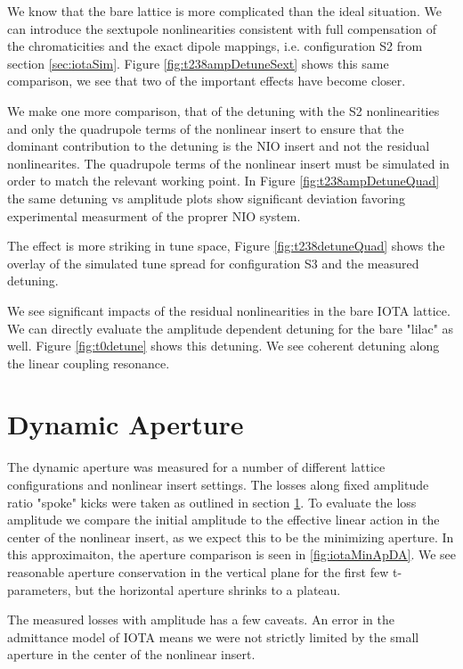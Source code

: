 We know that the bare lattice is more complicated than the ideal situation. We can introduce the sextupole nonlinearities consistent with full compensation of the chromaticities and the exact dipole mappings, i.e. configuration S2 from section \ref{sec:iotaSim}. Figure \ref{fig:t238ampDetuneSext} shows this same comparison, we see that two of the important effects have become closer.

We make one more comparison, that of the detuning with the S2 nonlinearities and only the quadrupole terms of the nonlinear insert to ensure that the dominant contribution to the detuning is the NIO insert and not the residual nonlinearites. The quadrupole terms of the nonlinear insert must be simulated in order to match the relevant working point. In Figure \ref{fig:t238ampDetuneQuad} the same detuning vs amplitude plots show significant deviation favoring experimental measurment of the proprer NIO system.

The effect is more striking in tune space, Figure \ref{fig:t238detuneQuad} shows the overlay of the simulated tune spread for configuration S3 and the measured detuning.

We see significant impacts of the residual nonlinearities in the bare IOTA lattice. We can directly evaluate the amplitude dependent detuning for the bare "lilac" as well. Figure \ref{fig:t0detune} shows this detuning. We see coherent detuning along the linear coupling resonance.

\section{Dynamic Aperture} \label{sec:DA}
The dynamic aperture was measured for a number of different lattice configurations and nonlinear insert settings. The losses along fixed amplitude ratio "spoke" kicks were taken as outlined in section \ref{sec:DA}. To evaluate the loss amplitude we compare the initial amplitude to the effective linear action in the center of the nonlinear insert, as we expect this to be the minimizing aperture. In this approximaiton, the aperture comparison is seen in \ref{fig:iotaMinApDA}. We see reasonable aperture conservation in the vertical plane for the first few t-parameters, but the horizontal aperture shrinks to a plateau.

The measured losses with amplitude has a few caveats. An error in the admittance model of IOTA means we were not strictly limited by the small aperture in the center of the nonlinear insert.


